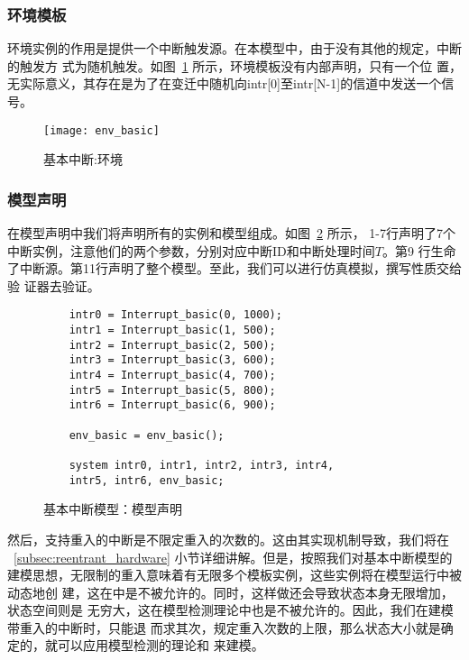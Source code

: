 \subsubsection{环境模板}
\label{subsubsec:basic_env}

环境实例的作用是提供一个中断触发源。在本模型中，由于没有其他的规定，中断的触发方
式为随机触发。如图~\ref{fig:evn_basic} 所示，环境模板没有内部声明，只有一个位
置，无实际意义，其存在是为了在变迁中随机向intr[0]至intr[N-1]的信道中发送一个信
号。

\begin{figure}[H]
	\centering
	\texttt{[image: env\_basic]}
	\caption{基本中断:环境}
	\label{fig:evn_basic}
\end{figure}

\subsubsection{模型声明}
\label{subsubsec:basic_model_decl}

在模型声明中我们将声明所有的实例和模型组成。如图~\ref{fig:basic_model_decl} 所示，
1-7行声明了7个中断实例，注意他们的两个参数，分别对应中断ID和中断处理时间$T$。第9
行生命了中断源。第11行声明了整个模型。至此，我们可以进行仿真模拟，撰写性质交给验
证器去验证。

\begin{figure}[H]
	\centering
	\begin{lstlisting}
	intr0 = Interrupt_basic(0, 1000);
	intr1 = Interrupt_basic(1, 500);
	intr2 = Interrupt_basic(2, 500);
	intr3 = Interrupt_basic(3, 600);
	intr4 = Interrupt_basic(4, 700);
	intr5 = Interrupt_basic(5, 800);
	intr6 = Interrupt_basic(6, 900);
	
	env_basic = env_basic();
	
	system intr0, intr1, intr2, intr3, intr4, 
	intr5, intr6, env_basic;
	\end{lstlisting}
	\caption{基本中断模型：模型声明}
	\label{fig:basic_model_decl}
\end{figure}


然后，支持重入的中断是不限定重入的次数的。这由其实现机制导致，我们将在
~\ref{subsec:reentrant_hardware} 小节详细讲解。但是，按照我们对基本中断模型的
建模思想，无限制的重入意味着有无限多个模板实例，这些实例将在模型运行中被动态地创
建，这在\uppaal 中是不被允许的。同时，这样做还会导致状态本身无限增加，状态空间则是
无穷大，这在模型检测理论中也是不被允许的。因此，我们在建模带重入的中断时，只能退
而求其次，规定重入次数的上限，那么状态大小就是确定的，就可以应用模型检测的理论和
\uppaal 来建模。

